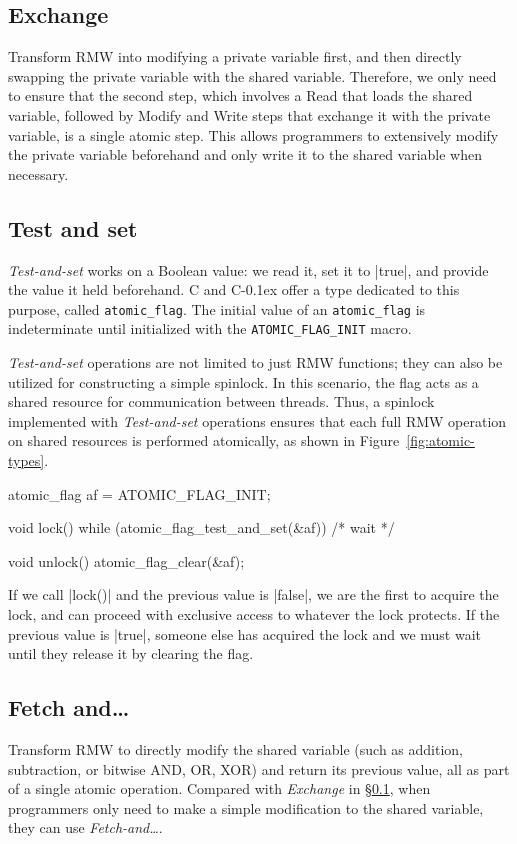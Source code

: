 \documentclass[fontsize=10pt, oneside]{scrartcl}
\newcommand{\monobox}[1]{\mbox{\texttt{#1}}}
\newcommand{\cplusplus}[1]{C\kern-0.1ex\raisebox{0.15ex}{\texttt{++}}}
\newcommand{\clang}[1]{C}
\newcommand{\fig}[1]{Figure~\ref{#1}}
\newcommand{\introduce}[1]{\textit{#1}}
\newcommand{\secref}[1]{\hyperref[#1]{\textsc{\S}\ref*{#1}}}
\begin{document}
\subsection{Exchange}
\label{exchange}
Transform \textsc{RMW} into modifying a private variable first, 
and then directly swapping the private variable with the shared variable. 
Therefore, we only need to ensure that the second step, 
which involves a Read that loads the shared variable, followed by Modify and Write steps that exchange it with the private variable,
is a single atomic step.
This allows programmers to extensively modify the private variable beforehand and only write it to the shared variable when necessary. 

\subsection{Test and set}
\label{Testandset}
\introduce{Test-and-set} works on a Boolean value:
we read it, set it to \cpp|true|, and provide the value it held beforehand.
\clang{} and \cplusplus{} offer a type dedicated to this purpose, called \monobox{atomic\_flag}.
The initial value of an \monobox{atomic\_flag} is indeterminate until initialized with the \monobox{ATOMIC\_FLAG\_INIT} macro.

\introduce{Test-and-set} operations are not limited to just \textsc{RMW} functions; 
they can also be utilized for constructing a simple spinlock.
In this scenario, the flag acts as a shared resource for communication between threads. 
Thus, a spinlock implemented with \introduce{Test-and-set} operations ensures that each full \textsc{RMW} operation on shared resources is performed atomically, as shown in \fig{fig:atomic-types}.
\label{spinlock}
\begin{ccode}
atomic_flag af = ATOMIC_FLAG_INIT;

void lock()
{
    while (atomic_flag_test_and_set(&af)) { /* wait */ }
}

void unlock() { atomic_flag_clear(&af); }
\end{ccode}
If we call \cc|lock()| and the previous value is \cc|false|,
we are the first to acquire the lock,
and can proceed with exclusive access to whatever the lock protects.
If the previous value is \cc|true|,
someone else has acquired the lock and we must wait until they release it by clearing the flag.

\subsection{Fetch and…}
Transform \textsc{RMW} to directly modify the shared variable (such as addition, subtraction,
or bitwise \textsc{AND}, \textsc{OR}, \textsc{XOR}) and return its previous value, 
all as part of a single atomic operation. 
Compared with \introduce{Exchange} in \secref{exchange}, when programmers only need to make a simple modification to the shared variable,
they can use \introduce{Fetch-and…}.
\end{document}
